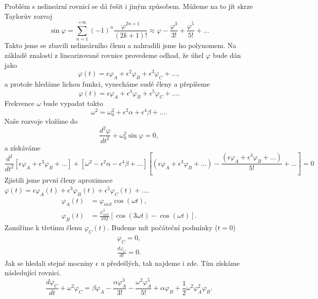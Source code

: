 {Problém s nelineární rovnicí se dá řešit i jiným způsobem. Můžeme na to jít skrze Taylorův rozvoj
\begin{equation}
\sin\varphi=\sum_{n=1}^{+\infty}(-1)^n\frac{\varphi^{2n+1}}{(2k+1)!}\approx\varphi-\frac{\varphi^3}{3!}+\frac{\varphi^5}{5!}+...
\end{equation}
Takto jsme se zbavili nelineárního členu a nahradili jsme ho polynomem. Na základě znalostí z linearizované rovnice provedeme odhad, že úhel $\varphi$ bude dán jako
\begin{equation}
\varphi(t)=\epsilon\varphi_A + \epsilon^2\varphi_B +\epsilon^3\varphi_C+...,
\end{equation}
a protože hledáme lichou funkci, vynecháme sudé členy a přepíšeme
\begin{equation}
\varphi(t)=\epsilon\varphi_A + \epsilon^3\varphi_B +\epsilon^5\varphi_C+....
\end{equation}
Frekvence $\omega$ bude vypadat takto
\begin{equation}
\omega^2=\omega_0^2+\epsilon^2\alpha+\epsilon^4\beta+....
\end{equation}
Naše rozvoje vložíme do
\begin{equation}
\frac{d^2\varphi}{dt^2}+\omega_0^2\sin\varphi=0,
\end{equation}
a získáváme
\begin{equation}
\frac{d^2}{dt^2}[\epsilon\varphi_A + \epsilon^3\varphi_B +...]+[\omega^2-\epsilon^2\alpha-\epsilon^4\beta+...]\left[(\epsilon\varphi_A + \epsilon^3\varphi_B +...)-\frac{(\epsilon\varphi_A + \epsilon^3\varphi_B +...)}{5!}+...\right]=0
\end{equation}
Zjistili jsme první členy aproximace $\varphi(t)=\epsilon\varphi_A(t) +\epsilon^3\varphi_B(t)+\epsilon^5\varphi_C(t)+...$.
\begin{align}
\varphi_A(t)&= \varphi_{init}\cos(\omega t),\\
\varphi_B(t)&=\frac{\varphi_{init}^3}{192}[\cos(3\omega t)-\cos(\omega t)].
\end{align}
Zamíříme k třetímu členu $\varphi_C(t)$. Budeme mít počáteční podmínky ($t=0$)
\begin{align}
\varphi_C = 0,\\
\frac{d\varphi_C}{dt}=0.
\end{align}
Jak se hledali stejné mocniny $\epsilon$ u předešlých, tak najdeme i zde. Tím získáme následující rovnici.
\begin{equation}
\frac{d\varphi_C}{dt}+\omega^2\varphi_C=\beta\varphi_A-\frac{\alpha\varphi_A^3}{3!}-\frac{\omega^2\varphi_A^5}{5!}+\alpha\varphi_B+\frac{1}{2}\omega^2\varphi_A^2\varphi_B.

\end{equation}}
